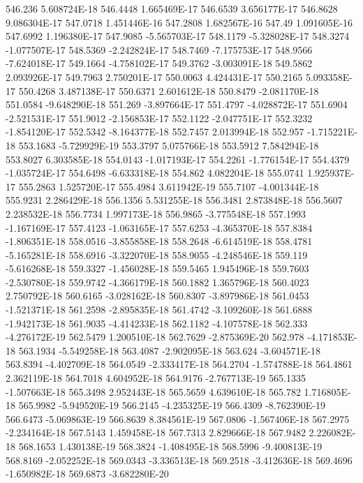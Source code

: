 546.236  5.608724E-18
546.4448  1.665469E-17
546.6539  3.656177E-17
546.8628  9.086304E-17
547.0718  1.451446E-16
547.2808  1.682567E-16
547.49  1.091605E-16
547.6992  1.196380E-17
547.9085  -5.565703E-17
548.1179  -5.328028E-17
548.3274  -1.077507E-17
548.5369  -2.242824E-17
548.7469  -7.175753E-17
548.9566  -7.624018E-17
549.1664  -4.758102E-17
549.3762  -3.003091E-18
549.5862  2.093926E-17
549.7963  2.750201E-17
550.0063  4.424431E-17
550.2165  5.093358E-17
550.4268  3.487138E-17
550.6371  2.601612E-18
550.8479  -2.081170E-18
551.0584  -9.648290E-18
551.269  -3.897664E-17
551.4797  -4.028872E-17
551.6904  -2.521531E-17
551.9012  -2.156853E-17
552.1122  -2.047751E-17
552.3232  -1.854120E-17
552.5342  -8.164377E-18
552.7457  2.013994E-18
552.957  -1.715221E-18
553.1683  -5.729929E-19
553.3797  5.075766E-18
553.5912  7.584294E-18
553.8027  6.303585E-18
554.0143  -1.017193E-17
554.2261  -1.776154E-17
554.4379  -1.035724E-17
554.6498  -6.633318E-18
554.862  4.082204E-18
555.0741  1.925937E-17
555.2863  1.525720E-17
555.4984  3.611942E-19
555.7107  -4.001344E-18
555.9231  2.286429E-18
556.1356  5.531255E-18
556.3481  2.873848E-18
556.5607  2.238532E-18
556.7734  1.997173E-18
556.9865  -3.775548E-18
557.1993  -1.167169E-17
557.4123  -1.063165E-17
557.6253  -4.365370E-18
557.8384  -1.806351E-18
558.0516  -3.855858E-18
558.2648  -6.614519E-18
558.4781  -5.165281E-18
558.6916  -3.322070E-18
558.9055  -4.248546E-18
559.119  -5.616268E-18
559.3327  -1.456028E-18
559.5465  1.945496E-18
559.7603  -2.530780E-18
559.9742  -4.366179E-18
560.1882  1.365796E-18
560.4023  2.750792E-18
560.6165  -3.028162E-18
560.8307  -3.897986E-18
561.0453  -1.521371E-18
561.2598  -2.895835E-18
561.4742  -3.109260E-18
561.6888  -1.942173E-18
561.9035  -4.414233E-18
562.1182  -4.107578E-18
562.333  -4.276172E-19
562.5479  1.200510E-18
562.7629  -2.875369E-20
562.978  -4.171853E-18
563.1934  -5.549258E-18
563.4087  -2.902095E-18
563.624  -3.604571E-18
563.8394  -4.402709E-18
564.0549  -2.333417E-18
564.2704  -1.574788E-18
564.4861  2.362119E-18
564.7018  4.604952E-18
564.9176  -2.767713E-19
565.1335  -1.507663E-18
565.3498  2.952443E-18
565.5659  4.639610E-18
565.782  1.716805E-18
565.9982  -5.949520E-19
566.2145  -4.235325E-19
566.4309  -8.762390E-19
566.6473  -5.069863E-19
566.8639  8.384561E-19
567.0806  -1.567406E-18
567.2975  -2.234164E-18
567.5143  1.459458E-18
567.7313  2.829666E-18
567.9482  2.226082E-18
568.1653  1.430138E-19
568.3824  -1.408495E-18
568.5996  -9.400813E-19
568.8169  -2.052252E-18
569.0343  -3.336513E-18
569.2518  -3.412636E-18
569.4696  -1.650982E-18
569.6873  -3.682280E-20
